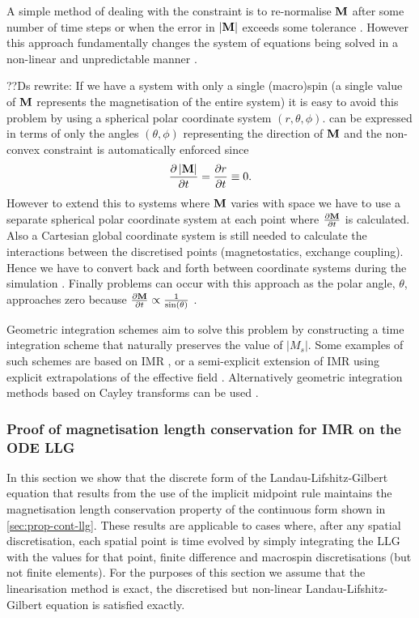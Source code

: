 A simple method of dealing with the constraint is to re-normalise $\mathbf{M}$ after some number of time steps or when the error in $|\mathbf{M}|$ exceeds some tolerance \cite{Fidler2000}.
However this approach fundamentally changes the system of equations being solved in a non-linear and unpredictable manner \cite{Lewis2003}.

??Ds rewrite:
If we have a system with only a single (macro)spin (\ie a single value of $\mathbf{M}$ represents the magnetisation of the entire system) it is easy to avoid this problem by using a spherical polar coordinate system $(r,\theta,\phi)$.
 can be expressed in terms of only the angles $(\theta,\phi)$ representing the direction of $\mathbf{M}$ and the non-convex constraint is automatically enforced since
\begin{equation}
  \label{eq:40}
  \frac{\partial \left|{\mathbf{M}} \right|}{\partial t} = \frac{\partial r}{\partial t} \equiv 0.
\end{equation}
However to extend this to systems where $\mathbf{M}$ varies with space we have to use a separate spherical polar coordinate system at each point where $\frac{\partial \mathbf{M}}{\partial t}$ is calculated.
Also a Cartesian global coordinate system is still needed to calculate the interactions between the discretised points (\ie magnetostatics, exchange coupling).
Hence we have to convert back and forth between coordinate systems during the simulation \cite{Scholz2003}.
Finally problems can occur with this approach as the polar angle, $\theta$, approaches zero because $\frac{\partial \mathbf{M}}{\partial t} \propto \frac{1}{\sin(\theta)}$ \cite{Fukushima2005}.

Geometric integration schemes aim to solve this problem by constructing a time integration scheme that naturally preserves the value of $|M_s|$.
Some examples of such schemes are based on IMR \cite{DAquino2005}, or a semi-explicit extension of IMR using explicit extrapolations of the effective field \cite{Spargo2003} \cite{Serpico2001}.
Alternatively geometric integration methods based on Cayley transforms can be used \cite{Lewis2003} \cite{Bottauscio2011}.


\subsubsection{Proof of magnetisation length conservation for IMR on the ODE LLG}
\label{sec:proof-magn-length-ode-imr-llg}

In this section we show that the discrete form of the Landau-Lifshitz-Gilbert equation that results from the use of the implicit midpoint rule maintains the magnetisation length conservation property of the continuous form shown in \cref{sec:prop-cont-llg}.
These results are applicable to cases where, after any spatial discretisation, each spatial point is time evolved by simply integrating the LLG with the values for that point, \ie finite difference and macrospin discretisations (but not finite elements).
For the purposes of this section we assume that the linearisation method is exact, \ie the discretised but non-linear Landau-Lifshitz-Gilbert equation is satisfied exactly.

